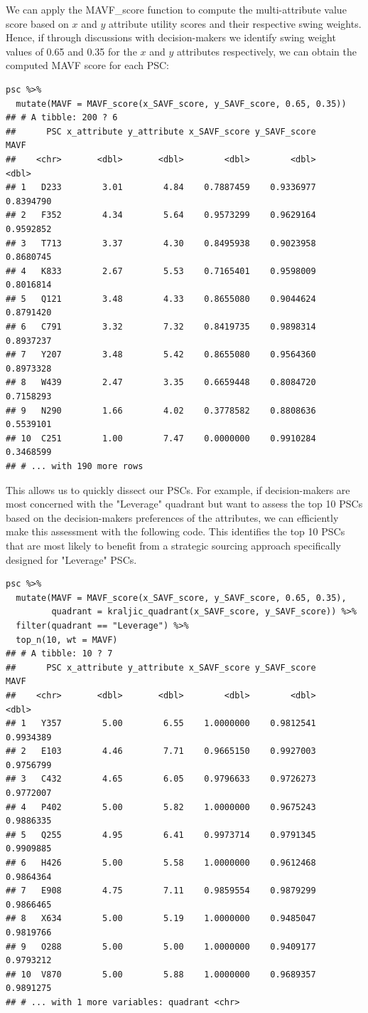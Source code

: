 \documentclass[twocolumn]{svjour3}       %
\begin{document}
We can apply the MAVF\_score function to compute the multi-attribute value score based on $x$ and $y$ attribute utility scores and their respective swing weights. Hence, if through discussions with decision-makers we identify swing weight values of 0.65 and 0.35 for the $x$ and $y$ attributes respectively, we can obtain the computed MAVF score for each PSC:

\begin{verbatim}
psc %>%
  mutate(MAVF = MAVF_score(x_SAVF_score, y_SAVF_score, 0.65, 0.35))
## # A tibble: 200 ? 6
##      PSC x_attribute y_attribute x_SAVF_score y_SAVF_score      MAVF
##    <chr>       <dbl>       <dbl>        <dbl>        <dbl>     <dbl>
## 1   D233        3.01        4.84    0.7887459    0.9336977 0.8394790
## 2   F352        4.34        5.64    0.9573299    0.9629164 0.9592852
## 3   T713        3.37        4.30    0.8495938    0.9023958 0.8680745
## 4   K833        2.67        5.53    0.7165401    0.9598009 0.8016814
## 5   Q121        3.48        4.33    0.8655080    0.9044624 0.8791420
## 6   C791        3.32        7.32    0.8419735    0.9898314 0.8937237
## 7   Y207        3.48        5.42    0.8655080    0.9564360 0.8973328
## 8   W439        2.47        3.35    0.6659448    0.8084720 0.7158293
## 9   N290        1.66        4.02    0.3778582    0.8808636 0.5539101
## 10  C251        1.00        7.47    0.0000000    0.9910284 0.3468599
## # ... with 190 more rows
\end{verbatim}

This allows us to quickly dissect our PSCs. For example, if decision-makers are most concerned with the "Leverage" quadrant but want to assess the top 10 PSCs based on the decision-makers preferences of the attributes, we can efficiently make this assessment with the following code. This identifies the top 10 PSCs that are most likely to benefit from a strategic sourcing approach specifically designed for "Leverage" PSCs.
\begin{verbatim}
psc %>%
  mutate(MAVF = MAVF_score(x_SAVF_score, y_SAVF_score, 0.65, 0.35),
         quadrant = kraljic_quadrant(x_SAVF_score, y_SAVF_score)) %>%
  filter(quadrant == "Leverage") %>%
  top_n(10, wt = MAVF)
## # A tibble: 10 ? 7
##      PSC x_attribute y_attribute x_SAVF_score y_SAVF_score      MAVF
##    <chr>       <dbl>       <dbl>        <dbl>        <dbl>     <dbl>
## 1   Y357        5.00        6.55    1.0000000    0.9812541 0.9934389
## 2   E103        4.46        7.71    0.9665150    0.9927003 0.9756799
## 3   C432        4.65        6.05    0.9796633    0.9726273 0.9772007
## 4   P402        5.00        5.82    1.0000000    0.9675243 0.9886335
## 5   Q255        4.95        6.41    0.9973714    0.9791345 0.9909885
## 6   H426        5.00        5.58    1.0000000    0.9612468 0.9864364
## 7   E908        4.75        7.11    0.9859554    0.9879299 0.9866465
## 8   X634        5.00        5.19    1.0000000    0.9485047 0.9819766
## 9   O288        5.00        5.00    1.0000000    0.9409177 0.9793212
## 10  V870        5.00        5.88    1.0000000    0.9689357 0.9891275
## # ... with 1 more variables: quadrant <chr>
\end{verbatim}
\end{document}
